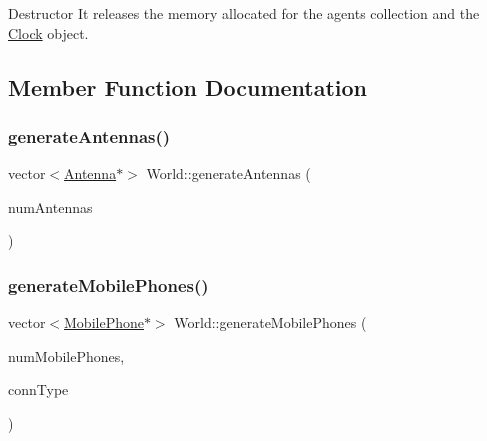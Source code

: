 Destructor It releases the memory allocated for the agents collection and the \mbox{\hyperlink{class_clock}{Clock}} object. 

\subsection{Member Function Documentation}
\mbox{\label{class_world_adbd58c8093be1ac349d929d9a4bc2ab0}} 
\subsubsection{\texorpdfstring{generateAntennas()}{generateAntennas()}}
{\footnotesize\ttfamily vector$<$\mbox{\hyperlink{class_antenna}{Antenna}}$\ast$$>$ World\+::generate\+Antennas (\begin{DoxyParamCaption}\item[{unsigned long}]{num\+Antennas }\end{DoxyParamCaption})\hspace{0.3cm}{\ttfamily [private]}}

\mbox{\label{class_world_a9ba6bd08d85c5f610ea30bf4f74b925d}} 
\subsubsection{\texorpdfstring{generateMobilePhones()}{generateMobilePhones()}}
{\footnotesize\ttfamily vector$<$\mbox{\hyperlink{class_mobile_phone}{Mobile\+Phone}}$\ast$$>$ World\+::generate\+Mobile\+Phones (\begin{DoxyParamCaption}\item[{int}]{num\+Mobile\+Phones,  }\item[{\mbox{\hyperlink{class_holdable_agent_ae2c334b004d7b9c5a999cf2618e4e518}{Holdable\+Agent\+::\+C\+O\+N\+N\+E\+C\+T\+I\+O\+N\+\_\+\+T\+Y\+PE}}}]{conn\+Type }\end{DoxyParamCaption})\hspace{0.3cm}{\ttfamily [private]}}

\mbox{\label{class_world_ada780d7d546a1dad038c83aad3f696df}} 
